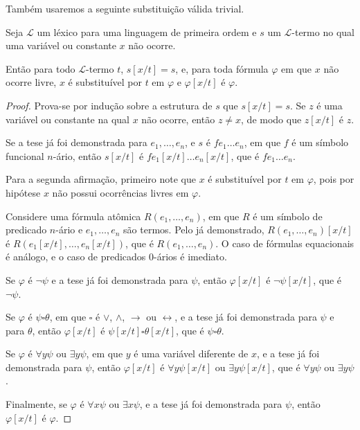 Também usaremos a seguinte substituição válida trivial.

\begin{metalemma}\label{mlem:substituicaoTrivial}
    Seja $\mathcal L$ um léxico para uma linguagem de primeira ordem e $s$ um $\mathcal L$-termo no qual uma variável ou constante $x$ não ocorre.

    Então para todo $\mathcal L$-termo $t$, $s[x/t]=s$, e, para toda fórmula $\varphi$ em que $x$ não ocorre livre, $x$ é substituível por $t$ em $\varphi$ e $\varphi[x/t]$ é $\varphi$.
\end{metalemma}
\begin{proof}
    Prova-se por indução sobre a estrutura de $s$ que $s[x/t]=s$.
    Se $z$ é uma variável ou constante na qual $x$ não ocorre, então $z\neq x$, de modo que $z[x/t]$ é $z$.

    Se a tese já foi demonstrada para $e_1, \dots, e_n$, e $s$ é $fe_1 \dots e_n$, em que $f$ é um símbolo funcional $n$-ário, então $s[x/t]$ é $fe_1[x/t] \dots e_n[x/t]$, que é $fe_1 \dots e_n$.

    Para a segunda afirmação, primeiro note que $x$ é substituível por $t$ em $\varphi$, pois por hipótese $x$ não possui ocorrências livres em $\varphi$.

    Considere uma fórmula atômica $R(e_1, \dots, e_n)$, em que $R$ é um símbolo de predicado $n$-ário e $e_1, \dots, e_n$ são termos.
    Pelo já demonstrado, $R(e_1, \dots, e_n)[x/t]$ é $R(e_1[x/t], \dots, e_n[x/t])$, que é $R(e_1, \dots, e_n)$.
    O caso de fórmulas equacionais é análogo, e o caso de predicados $0$-ários é imediato.

    Se $\varphi$ é $\neg \psi$ e a tese já foi demonstrada para $\psi$, então $\varphi[x/t]$ é $\neg \psi[x/t]$, que é $\neg \psi$.

    Se $\varphi$ é $\psi \square \theta$, em que $\square$ é $\vee$, $\wedge$, $\rightarrow$ ou $\leftrightarrow$, e a tese já foi demonstrada para $\psi$ e para $\theta$, então $\varphi[x/t]$ é $\psi[x/t] \square \theta[x/t]$, que é $\psi \square \theta$.

    Se $\varphi$ é $\forall y \psi$ ou $\exists y \psi$, em que $y$ é uma variável diferente de $x$, e a tese já foi demonstrada para $\psi$, então $\varphi[x/t]$ é $\forall y \psi[x/t]$ ou $\exists y \psi[x/t]$, que é $\forall y \psi$ ou $\exists y \psi$.

    Finalmente, se $\varphi$ é $\forall x \psi$ ou $\exists x \psi$, e a tese já foi demonstrada para $\psi$, então $\varphi[x/t]$ é $\varphi$.
\end{proof}

